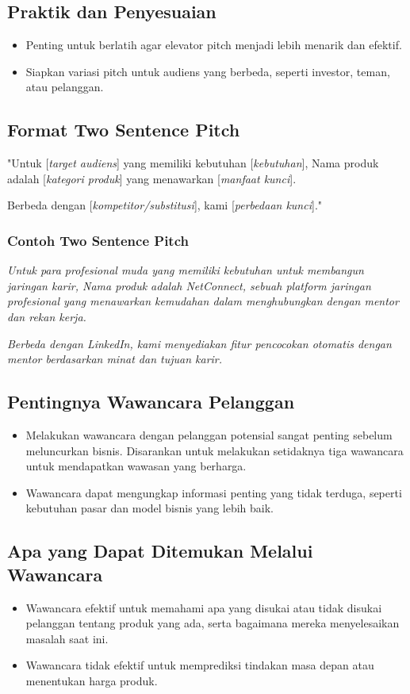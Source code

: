 \documentclass{article}
\begin{document}
\subsection{Praktik dan Penyesuaian}
\begin{itemize}
    \item Penting untuk berlatih agar elevator pitch menjadi lebih menarik dan efektif.
    \item Siapkan variasi pitch untuk audiens yang berbeda, seperti investor, teman, atau pelanggan.
\end{itemize}

\subsection{Format Two Sentence Pitch}
"Untuk [\textit{target audiens}] yang memiliki kebutuhan [\textit{kebutuhan}], Nama produk adalah [\textit{kategori produk}] yang menawarkan [\textit{manfaat kunci}].

Berbeda dengan [\textit{kompetitor/substitusi}], kami [\textit{perbedaan kunci}]."

\subsubsection{Contoh Two Sentence Pitch}
\textit{Untuk para profesional muda yang memiliki kebutuhan untuk membangun jaringan karir, Nama produk adalah NetConnect, sebuah platform jaringan profesional yang menawarkan kemudahan dalam menghubungkan dengan mentor dan rekan kerja.}

\textit{Berbeda dengan LinkedIn, kami menyediakan fitur pencocokan otomatis dengan mentor berdasarkan minat dan tujuan karir.}


\subsection{Pentingnya Wawancara Pelanggan}
\begin{itemize}
    \item Melakukan wawancara dengan pelanggan potensial sangat penting sebelum meluncurkan bisnis. Disarankan untuk melakukan setidaknya tiga wawancara untuk mendapatkan wawasan yang berharga.
    \item Wawancara dapat mengungkap informasi penting yang tidak terduga, seperti kebutuhan pasar dan model bisnis yang lebih baik.
\end{itemize}

\subsection{Apa yang Dapat Ditemukan Melalui Wawancara}
\begin{itemize}
    \item Wawancara efektif untuk memahami apa yang disukai atau tidak disukai pelanggan tentang produk yang ada, serta bagaimana mereka menyelesaikan masalah saat ini.
    \item Wawancara tidak efektif untuk memprediksi tindakan masa depan atau menentukan harga produk.
\end{itemize}
\end{document}
